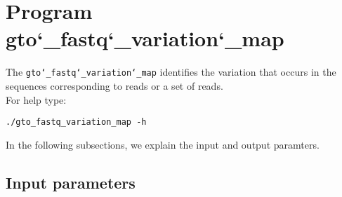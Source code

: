 \section{Program gto\char`_fastq\char`_variation\char`_map}
The \texttt{gto\char`_fastq\char`_variation\char`_map} identifies the variation that occurs in the sequences corresponding to reads or a set of reads.\\
For help type:
\begin{lstlisting}
./gto_fastq_variation_map -h
\end{lstlisting}
In the following subsections, we explain the input and output paramters.

\subsection*{Input parameters}

